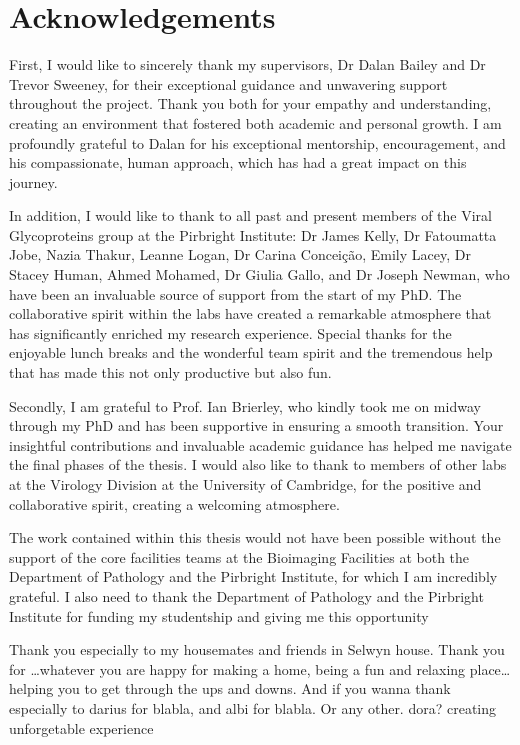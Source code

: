 \chapter{Acknowledgements}
First, I would like to sincerely thank my supervisors, Dr Dalan Bailey and Dr Trevor Sweeney, for their exceptional guidance and unwavering support throughout the project. Thank you both for your empathy and understanding, creating an environment that fostered both academic and personal growth. I am profoundly grateful to Dalan for his exceptional mentorship, encouragement, and his compassionate, human approach, which has had a great impact on this journey. 

In addition, I would like to thank to all past and present members of the Viral Glycoproteins group at the Pirbright Institute: Dr James Kelly, Dr Fatoumatta Jobe, Nazia Thakur, Leanne Logan, Dr Carina Conceição, Emily Lacey, Dr Stacey Human, Ahmed Mohamed, Dr Giulia Gallo, and  Dr Joseph Newman, who have been an invaluable source of support from the start of my PhD. The collaborative spirit within the labs have created a remarkable atmosphere that has significantly enriched my research experience. Special thanks for the enjoyable lunch breaks and the wonderful team spirit and the tremendous help that has made this not only productive but also fun.

Secondly, I am grateful to Prof. Ian Brierley, who kindly took me on midway through my PhD and has been supportive in ensuring a smooth transition. Your insightful contributions and invaluable academic guidance has helped me navigate the final phases of the thesis. I would also like to thank to members	of other labs at the Virology Division at the University of Cambridge, for the positive and collaborative spirit, creating a welcoming atmosphere.

The work contained within this thesis would not have been possible without the support of the core facilities teams at the Bioimaging Facilities at both the Department of Pathology and the Pirbright Institute, for which I am incredibly grateful. I also need to thank the Department of Pathology and the Pirbright Institute for funding my studentship and giving me this opportunity

Thank you especially to my housemates and friends in Selwyn house. Thank you for …whatever you are happy for making a home, being a fun and relaxing place…helping you to get through the ups and downs. And if you wanna thank especially to darius for blabla, and albi for blabla. Or any other. dora? creating unforgetable experience

